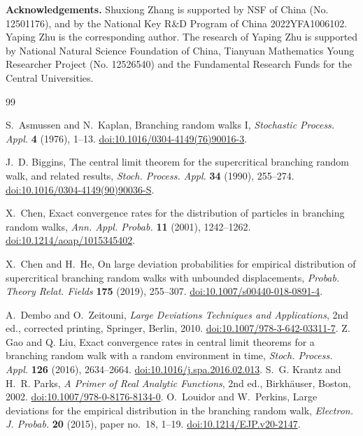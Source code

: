 \documentclass[a4paper, 11pt]{article}
\newcommand{\1}{\mathbf 1}
\theoremstyle{plain}
\begin{document}
\textbf{Acknowledgements.} Shuxiong Zhang is supported by NSF of China (No. 12501176), and by the National Key R\&D Program of
China 2022YFA1006102. Yaping Zhu is the corresponding author. The research of Yaping Zhu is supported by National Natural Science Foundation of China, Tianyuan Mathematics Young Researcher Project (No. 12526540) and the Fundamental Research Funds for the Central Universities.
\begin{thebibliography}{99}

S.~Asmussen and N.~Kaplan,
\newblock Branching random walks I,
\newblock \emph{Stochastic Process. Appl.} \textbf{4} (1976), 1--13.
\newblock \href{https://doi.org/10.1016/0304-4149(76)90016-3}
{doi:10.1016/0304-4149(76)90016-3}.

J.~D. Biggins,
\newblock The central limit theorem for the supercritical branching random
walk, and related results,
\newblock \emph{Stoch. Process. Appl.} \textbf{34} (1990), 255--274.
\newblock \href{https://doi.org/10.1016/0304-4149(90)90036-S}
{doi:10.1016/0304-4149(90)90036-S}.

X.~Chen,
\newblock Exact convergence rates for the distribution of particles in
branching random walks,
\newblock \emph{Ann. Appl. Probab.} \textbf{11} (2001), 1242--1262.
\newblock \href{https://doi.org/10.1214/aoap/1015345402}
{doi:10.1214/aoap/1015345402}.

X.~Chen and H.~He,
\newblock On large deviation probabilities for empirical distribution of
supercritical branching random walks with unbounded displacements,
\newblock \emph{Probab. Theory Relat. Fields} \textbf{175} (2019), 255--307.
\newblock \href{https://doi.org/10.1007/s00440-018-0891-4}
{doi:10.1007/s00440-018-0891-4}.

A.~Dembo and O.~Zeitouni,
\newblock \emph{Large Deviations Techniques and Applications},
\newblock 2nd ed., corrected printing, Springer, Berlin, 2010.
\newblock \href{https://doi.org/10.1007/978-3-642-03311-7}
{doi:10.1007/978-3-642-03311-7}.
Z. Gao and Q. Liu,
 \newblock Exact convergence rates in central limit theorems for a branching random walk with
a random environment in time,
\newblock \emph{Stoch. Process. Appl.} \textbf{126} (2016), 2634--2664.
\newblock \href{https://doi.org/10.1016/j.spa.2016.02.013}
{doi:10.1016/j.spa.2016.02.013}.
S.~G. Krantz and H.~R. Parks,
\newblock \emph{A Primer of Real Analytic Functions},
\newblock 2nd ed., Birkh\"auser, Boston, 2002.
\newblock \href{https://doi.org/10.1007/978-0-8176-8134-0}
{doi:10.1007/978-0-8176-8134-0}.
O.~Louidor and W.~Perkins,
\newblock Large deviations for the empirical distribution in the branching
random walk,
\newblock \emph{Electron. J. Probab.} \textbf{20} (2015), paper no.~18,
1--19.
\newblock \href{https://doi.org/10.1214/EJP.v20-2147}
{doi:10.1214/EJP.v20-2147}.


\end{thebibliography}
\end{document}
